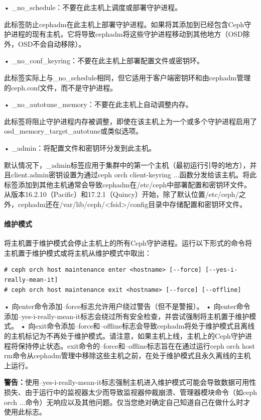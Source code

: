 \documentclass[12pt,UTF8]{ctexbook}
\begin{document}
• _no_schedule：不要在此主机上调度或部署守护进程。

此标签防止cephadm在此主机上部署守护进程。如果将其添加到已经包含Ceph守护进程的现有主机，它将导致cephadm将这些守护进程移动到其他地方（OSD除外，OSD不会自动移除）。

• _no_conf_keyring：不要在此主机上部署配置文件或密钥环。

此标签实际上与_no_schedule相同，但它适用于客户端密钥环和由cephadm管理的ceph.conf文件，而不是守护进程。

• _no_autotune_memory：不要在此主机上自动调整内存。

此标签将阻止守护进程内存被调整，即使在该主机上为一个或多个守护进程启用了osd_memory_target_autotune或类似选项。

• _admin：将配置文件和密钥环分发到此主机。

默认情况下，_admin标签应用于集群中的第一个主机（最初运行引导的地方），并且client.admin密钥设置为通过ceph orch client-keyring ...函数分发给该主机。将此标签添加到其他主机通常会导致cephadm在/etc/ceph中部署配置和密钥环文件。从版本16.2.10（Pacific）和17.2.1（Quincy）开始，除了默认位置/etc/ceph/之外，cephadm还在/var/lib/ceph/<fsid>/config目录中存储配置和密钥环文件。

\paragraph{维护模式}

将主机置于维护模式会停止主机上的所有Ceph守护进程。运行以下形式的命令将主机置于维护模式或将主机从维护模式中取出：
\begin{verbatim}
# ceph orch host maintenance enter <hostname> [--force] [--yes-i-really-mean-it]
# ceph orch host maintenance exit <hostname> [--force] [--offline]
\end{verbatim}

• 向enter命令添加--force标志允许用户绕过警告（但不是警报）。
• 向enter命令添加--yes-i-really-mean-it标志会绕过所有安全检查，并尝试强制将主机置于维护模式。
• 向exit命令添加--force和--offline标志会导致cephadm将处于维护模式且离线的主机标记为不再处于维护模式。请注意，如果主机上线，主机上的Ceph守护进程将保持停止状态。exit命令的--force和--offline标志旨在在通过运行ceph orch host rm命令从cephadm管理中移除这些主机之前，在处于维护模式且永久离线的主机上运行。

\textbf{警告：}使用--yes-i-really-mean-it标志强制主机进入维护模式可能会导致数据可用性损失、由于运行中的监视器太少而导致监视器仲裁崩溃、管理器模块命令（如ceph orch ...命令）无响应以及其他问题。仅当您绝对确定自己知道自己在做什么时才使用此标志。
\end{document}

